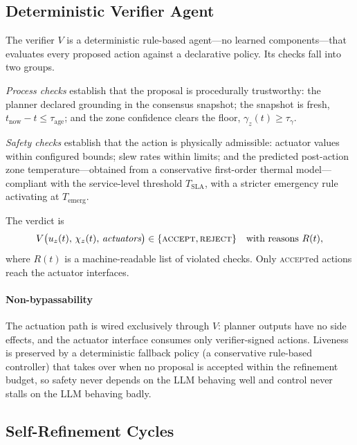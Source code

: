 \documentclass[preprint,11pt]{elsarticle}
\begin{document}
\subsection{Deterministic Verifier Agent}
\label{sec:verifier}

The verifier $V$ is a deterministic rule-based agent---no learned
components---that evaluates every proposed action against a declarative
policy. Its checks fall into two groups.

\emph{Process checks} establish that the proposal is procedurally
trustworthy: the planner declared grounding in the consensus snapshot;
the snapshot is fresh, $t_{\mathrm{now}}-t \leq \tau_{\mathrm{age}}$;
and the zone confidence clears the floor,
$\gamma_z(t)\geq\tau_{\gamma}$.

\emph{Safety checks} establish that the action is physically
admissible: actuator values within configured bounds; slew rates within
limits; and the predicted post-action zone temperature---obtained from
a conservative first-order thermal model---compliant with the
service-level threshold $T_{\mathrm{SLA}}$, with a stricter emergency
rule activating at $T_{\mathrm{emerg}}$.

The verdict is
\begin{equation}
V\bigl(u_z(t),\,\chi_z(t),\,\textit{actuators}\bigr)\in
\{\textsc{accept},\textsc{reject}\}
\quad\text{with reasons } R(t),
\label{eq:verdict}
\end{equation}
where $R(t)$ is a machine-readable list of violated checks. Only
\textsc{accept}ed actions reach the actuator interfaces.

\paragraph{Non-bypassability}
The actuation path is wired exclusively through $V$: planner outputs
have no side effects, and the actuator interface consumes only
verifier-signed actions. Liveness is preserved by a deterministic
fallback policy (a conservative rule-based controller) that takes over
when no proposal is accepted within the refinement budget, so safety
never depends on the LLM behaving well and control never stalls on the
LLM behaving badly.

\subsection{Self-Refinement Cycles}
\label{sec:refinement}
\end{document}
